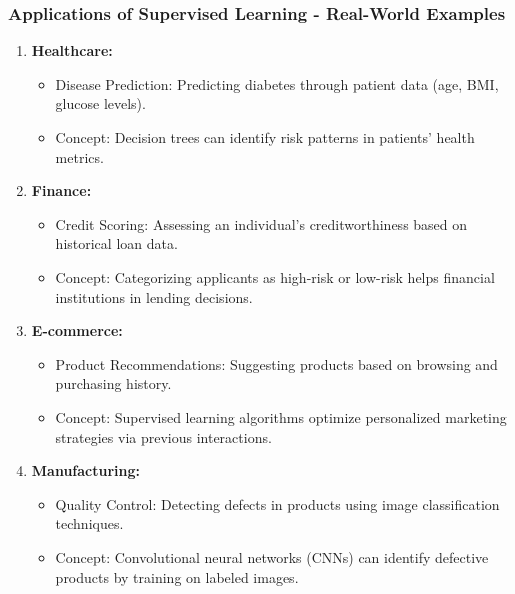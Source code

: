 \documentclass[aspectratio=169]{beamer}
\begin{document}
\begin{frame}[fragile]
    \frametitle{Applications of Supervised Learning - Real-World Examples}
    \begin{enumerate}
        \item \textbf{Healthcare:}
        \begin{itemize}
            \item Disease Prediction: Predicting diabetes through patient data (age, BMI, glucose levels).
            \item Concept: Decision trees can identify risk patterns in patients' health metrics.
        \end{itemize}
        
        \item \textbf{Finance:}
        \begin{itemize}
            \item Credit Scoring: Assessing an individual's creditworthiness based on historical loan data.
            \item Concept: Categorizing applicants as high-risk or low-risk helps financial institutions in lending decisions.
        \end{itemize}
        
        \item \textbf{E-commerce:}
        \begin{itemize}
            \item Product Recommendations: Suggesting products based on browsing and purchasing history.
            \item Concept: Supervised learning algorithms optimize personalized marketing strategies via previous interactions.
        \end{itemize}

        \item \textbf{Manufacturing:}
        \begin{itemize}
            \item Quality Control: Detecting defects in products using image classification techniques.
            \item Concept: Convolutional neural networks (CNNs) can identify defective products by training on labeled images.
        \end{itemize}
    \end{enumerate}
\end{frame}
\end{document}

